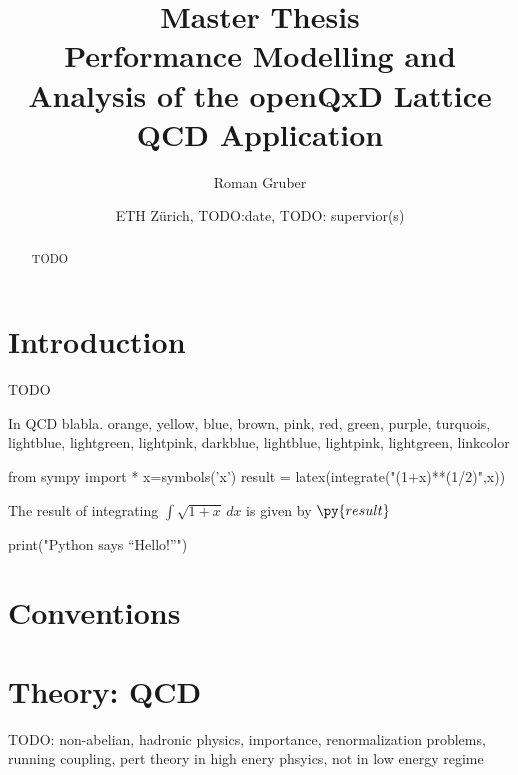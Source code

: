 \documentclass{article}
\title{Master Thesis \\ Performance Modelling and Analysis of the openQxD Lattice QCD Application}
\author{Roman Gruber}
\date{ETH Zürich, TODO:date, TODO: supervior(s)}
\theoremstyle{plain} %
\theoremstyle{remark} %
\numberwithin{equation}{section}
\begin{document}
\maketitle

\begin{abstract}
TODO
\end{abstract}

\doclicenseThis

\noindent\textcolor{gray}{\hrulefill}

\tableofcontents

\noindent\textcolor{gray}{\hrulefill}

\section{Introduction}

TODO

In \acrshort{QCD} blabla. \textcolor{corange}{orange}, \textcolor{cyellow}{yellow}, \textcolor{cblue}{blue}, \textcolor{cbrown}{brown}, \textcolor{cpink}{pink}, \textcolor{cred}{red}, \textcolor{cgreen}{green}, \textcolor{cpurple}{purple}, \textcolor{cturquois}{turquois}, \textcolor{clightblue}{lightblue}, \textcolor{clightgreen}{lightgreen}, \textcolor{clightpink}{lightpink},  \textcolor{cdarkblue}{darkblue}, \colorbox{clightblue}{lightblue}, \colorbox{clightpink}{lightpink}, \colorbox{clightgreen}{lightgreen}, \textcolor{linkcolor}{linkcolor}

\begin{pycode}
from sympy import *
x=symbols('x')
result = latex(integrate("(1+x)**(1/2)",x))
\end{pycode}
 
The result of integrating $\int \sqrt{ 1+x } \, dx$ is given by $\py{result}$

\begin{pycode}
print("Python says ``Hello!''")
\end{pycode}

\section{Conventions}

\section{Theory: QCD}

TODO:
non-abelian, hadronic physics, importance, renormalization problems, running coupling, pert theory in high enery phsyics, not in low energy regime
\end{document}
